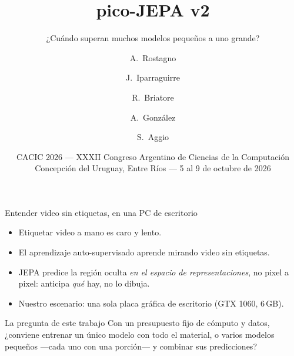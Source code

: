 \documentclass[aspectratio=169,10pt]{beamer}
\title[pico-JEPA v2]{pico-JEPA v2}
\subtitle{¿Cuándo superan muchos modelos pequeños a uno grande?}
\author[A. Rostagno et al.]{A.~Rostagno \and J.~Iparraguirre \and
                            R.~Briatore \and A.~González \and S.~Aggio}
\institute{Universidad Tecnológica Nacional\\
           Facultad Regional Bahía Blanca, Argentina\\
           \url{https://github.com/BHI-Research/pico-jepa-v2}}
\date{CACIC 2026 --- XXXII Congreso Argentino de Ciencias de la Computación\\
      Concepción del Uruguay, Entre Ríos --- 5 al 9 de octubre de 2026}
\begin{document}
\begin{frame}
  \titlepage
\end{frame}

\begin{frame}{Entender video sin etiquetas, en una PC de escritorio}
  \begin{itemize}
    \item Etiquetar video a mano es caro y lento.
    \item El aprendizaje \alert{auto-supervisado} aprende mirando video
          \alert{sin etiquetas}.
    \item \alert{JEPA} predice la región oculta \emph{en el espacio de
          representaciones}, no pixel a pixel: anticipa \emph{qué} hay, no
          lo dibuja.
    \item Nuestro escenario: una sola placa gráfica de escritorio
          (GTX 1060, 6\,GB).
  \end{itemize}

  \vfill
  \begin{block}{La pregunta de este trabajo}
    Con un presupuesto fijo de cómputo y datos, ¿conviene entrenar
    \alert{un único modelo} con todo el material, o \alert{varios modelos
    pequeños} ---cada uno con una porción--- y combinar sus predicciones?
  \end{block}
\end{frame}
\end{document}
